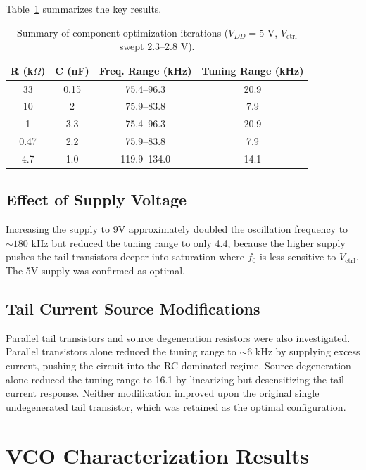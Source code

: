\documentclass[11pt]{article}
\begin{document}
Table~\ref{tab:design_iterations} summarizes the key results.

\begin{table}[h]
    \centering
    \caption{Summary of component optimization iterations ($V_{DD} = 5\text{ V}$, $V_{\text{ctrl}}$ swept 2.3--2.8 V).}
    \label{tab:design_iterations}
    \begin{tabular}{cccc}
        \hline
        \textbf{R (k}\(\Omega\)\textbf{)} &
        \textbf{C (nF)} &
        \textbf{Freq. Range (kHz)} &
        \textbf{Tuning Range (kHz)} \\
        \hline
        33   & 0.15 & 75.4--96.3  & 20.9 \\
        10   & 2    & 75.9--83.8  & 7.9  \\
        1    & 3.3  & 75.4--96.3  & 20.9 \\
        0.47 & 2.2  & 75.9--83.8  & 7.9  \\
        4.7  & 1.0  & 119.9--134.0 & 14.1 \\
        \hline
    \end{tabular}
\end{table}


\subsection{Effect of Supply Voltage}

Increasing the supply to 9V approximately doubled the oscillation frequency to
$\sim 180\text{ kHz}$ but reduced the tuning range to only 4.4, because the
higher supply pushes the tail transistors deeper into saturation where $f_0$ is less
sensitive to $V_{\text{ctrl}}$. The 5V supply was confirmed as optimal.

\subsection{Tail Current Source Modifications}

Parallel tail transistors and source degeneration resistors were also investigated. Parallel
transistors alone reduced the tuning range to $\sim 6\text{ kHz}$ by supplying excess current,
pushing the circuit into the RC-dominated regime. Source degeneration alone reduced the
tuning range to 16.1 by linearizing but desensitizing the tail current response.
Neither modification improved upon the original single undegenerated tail transistor,
which was retained as the optimal configuration.

\section{VCO Characterization Results}
\end{document}
